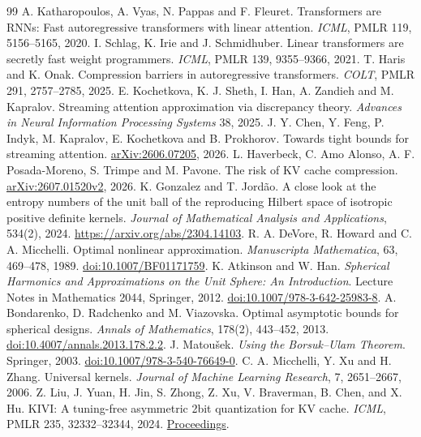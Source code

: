 \begin{thebibliography}{99}
 A. Katharopoulos, A. Vyas, N. Pappas and F. Fleuret.
Transformers are RNNs: Fast autoregressive transformers with linear attention. \emph{ICML}, PMLR 119, 5156--5165, 2020.
 I. Schlag, K. Irie and J. Schmidhuber.
Linear transformers are secretly fast weight programmers. \emph{ICML}, PMLR 139, 9355--9366, 2021.
 T. Haris and K. Onak.
Compression barriers in autoregressive transformers. \emph{COLT}, PMLR 291, 2757--2785, 2025.
 E. Kochetkova, K. J. Sheth, I. Han, A. Zandieh and M. Kapralov.
Streaming attention approximation via discrepancy theory. \emph{Advances in Neural Information Processing Systems} 38, 2025.
 J. Y. Chen, Y. Feng, P. Indyk, M. Kapralov, E. Kochetkova and B. Prokhorov.
Towards tight bounds for streaming attention. \href{https://arxiv.org/abs/2606.07205}{arXiv:2606.07205}, 2026.
 L. Haverbeck, C. Amo Alonso, A. F. Posada-Moreno, S. Trimpe and M. Pavone.
The risk of KV cache compression. \href{https://arxiv.org/abs/2607.01520}{arXiv:2607.01520v2}, 2026.
 K. Gonzalez and T. Jord\~ao. A close look at the entropy numbers of the unit ball of the reproducing Hilbert space of isotropic positive definite kernels. \emph{Journal of Mathematical Analysis and Applications}, 534(2), 2024. \url{https://arxiv.org/abs/2304.14103}.
 R. A. DeVore, R. Howard and C. A. Micchelli.
Optimal nonlinear approximation. \emph{Manuscripta Mathematica}, 63, 469--478, 1989. \href{https://doi.org/10.1007/BF01171759}{doi:10.1007/BF01171759}.
 K. Atkinson and W. Han.
\emph{Spherical Harmonics and Approximations on the Unit Sphere: An Introduction}.
Lecture Notes in Mathematics 2044, Springer, 2012. \href{https://doi.org/10.1007/978-3-642-25983-8}{doi:10.1007/978-3-642-25983-8}.
 A. Bondarenko, D. Radchenko and M. Viazovska.
Optimal asymptotic bounds for spherical designs. \emph{Annals of Mathematics}, 178(2), 443--452, 2013. \href{https://doi.org/10.4007/annals.2013.178.2.2}{doi:10.4007/annals.2013.178.2.2}.
 J. Matou\v{s}ek. \emph{Using the Borsuk--Ulam Theorem}. Springer, 2003. \href{https://doi.org/10.1007/978-3-540-76649-0}{doi:10.1007/978-3-540-76649-0}.
 C. A. Micchelli, Y. Xu and H. Zhang. Universal kernels. \emph{Journal of Machine Learning Research}, 7, 2651--2667, 2006.
 Z. Liu, J. Yuan, H. Jin, S. Zhong, Z. Xu, V. Braverman, B. Chen, and X. Hu. KIVI: A tuning-free asymmetric 2bit quantization for KV cache. \emph{ICML}, PMLR 235, 32332--32344, 2024. \href{https://proceedings.mlr.press/v235/liu24bz.html}{Proceedings}.

\end{thebibliography}

